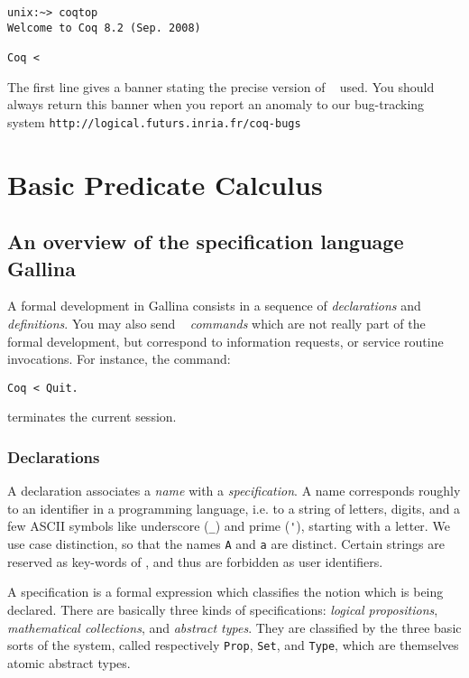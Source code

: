 \documentclass{book}
\begin{document}
\begin{small}
\begin{flushleft}
\begin{verbatim}
unix:~> coqtop
Welcome to Coq 8.2 (Sep. 2008)

Coq < 
\end{verbatim}
\end{flushleft}
\end{small}

The first line gives a banner stating the precise version of \Coq~
used. You should always return this banner when you report an anomaly
to our bug-tracking system
\verb|http://logical.futurs.inria.fr/coq-bugs|

\chapter{Basic Predicate Calculus}

\section{An overview of the specification language Gallina}

A formal development in Gallina consists in a sequence of {\sl declarations}
and {\sl definitions}. You may also send \Coq~ {\sl commands} which are
not really part of the formal development, but correspond to information
requests, or service routine invocations. For instance, the command:
\begin{verbatim}
Coq < Quit.
\end{verbatim}
terminates the current session.

\subsection{Declarations}

A declaration associates a {\sl name} with 
a {\sl specification}. 
A name corresponds roughly to an identifier in a programming
language, i.e. to a string of letters, digits, and a few ASCII symbols like
underscore (\verb"_") and prime (\verb"'"), starting with a letter. 
We use case distinction, so that the names \verb"A" and \verb"a" are distinct.
Certain strings are reserved as key-words of \Coq, and thus are forbidden 
as user identifiers.

A specification is a formal expression which classifies the notion which is
being declared. There are basically three kinds of specifications: 
{\sl logical propositions}, {\sl mathematical collections}, and
{\sl abstract types}. They are classified by the three basic sorts
of the system, called respectively \verb:Prop:, \verb:Set:, and
\verb:Type:, which are themselves atomic abstract types.
\end{document}
